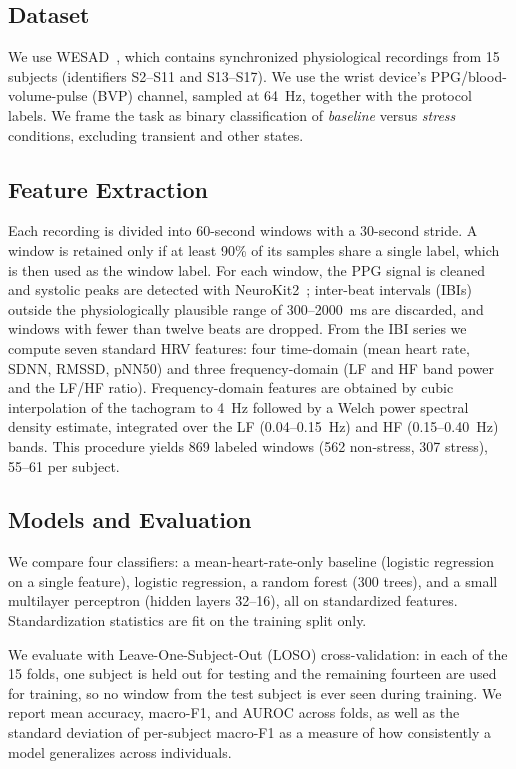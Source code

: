 \documentclass[conference]{IEEEtran}
\begin{document}
\subsection{Dataset}
We use WESAD~\cite{schmidt2018wesad}, which contains synchronized physiological
recordings from 15 subjects (identifiers S2--S11 and S13--S17). We use the wrist
device's PPG/blood-volume-pulse (BVP) channel, sampled at 64~Hz, together with the
protocol labels. We frame the task as binary classification of \emph{baseline}
versus \emph{stress} conditions, excluding transient and other states.

\subsection{Feature Extraction}
Each recording is divided into 60-second windows with a 30-second stride. A window
is retained only if at least 90\% of its samples share a single label, which is
then used as the window label. For each window, the PPG signal is cleaned and
systolic peaks are detected with NeuroKit2~\cite{makowski2021neurokit}; inter-beat
intervals (IBIs) outside the physiologically plausible range of 300--2000~ms are
discarded, and windows with fewer than twelve beats are dropped. From the IBI
series we compute seven standard HRV features: four time-domain
(mean heart rate, SDNN, RMSSD, pNN50) and three frequency-domain (LF and HF band
power and the LF/HF ratio). Frequency-domain features are obtained by cubic
interpolation of the tachogram to 4~Hz followed by a Welch power spectral density
estimate, integrated over the LF (0.04--0.15~Hz) and HF (0.15--0.40~Hz) bands.
This procedure yields 869 labeled windows (562 non-stress, 307 stress), 55--61 per
subject.

\subsection{Models and Evaluation}
We compare four classifiers: a mean-heart-rate-only baseline (logistic regression
on a single feature), logistic regression, a random forest (300 trees), and a
small multilayer perceptron (hidden layers 32--16), all on standardized features.
Standardization statistics are fit on the training split only.

We evaluate with Leave-One-Subject-Out (LOSO) cross-validation: in each of the 15
folds, one subject is held out for testing and the remaining fourteen are used for
training, so no window from the test subject is ever seen during training. We
report mean accuracy, macro-F1, and AUROC across folds, as well as the standard
deviation of per-subject macro-F1 as a measure of how consistently a model
generalizes across individuals.
\end{document}
